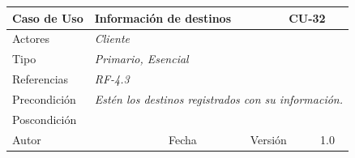 \begin{table}[H]
    \begin{tabular}{|llllllll|}
    \hline
    \multicolumn{1}{|l|}{Caso de Uso}                     & \multicolumn{5}{l|}{Información de destinos}                                                                                                                                                & \multicolumn{2}{l|}{\cellcolor[HTML]{E6E6E6}CU-32}                                      \\ \hline
    \multicolumn{1}{|l|}{Actores}                         & \multicolumn{7}{l|}{{\color[HTML]{808080} \textit{Cliente}}}                                                                                                                                                                                                                          \\ \hline
    \multicolumn{1}{|l|}{Tipo}                            & \multicolumn{7}{l|}{{\color[HTML]{808080} \textit{Primario, Esencial}}}                                                                                                                                                                                                               \\ \hline
    \multicolumn{1}{|l|}{Referencias}                     & \multicolumn{2}{l|}{{\color[HTML]{808080} \textit{RF-4.3}}}                                        & \multicolumn{5}{l|}{}                                                                                                                                                            \\ \hline
    \multicolumn{1}{|l|}{Precondición}                    & \multicolumn{7}{l|}{{\color[HTML]{808080} \textit{Estén los destinos registrados con su información.}}}                                                                                                                                                                               \\ \hline
    \multicolumn{1}{|l|}{Poscondición}                    & \multicolumn{7}{l|}{}                                                                                                                                                                                                                                                                 \\ \hline
    \multicolumn{1}{|l|}{Autor}                           & \multicolumn{1}{l|}{}                                     & \multicolumn{2}{l|}{Fecha}                                     & \multicolumn{1}{l|}{}                   & \multicolumn{2}{l|}{Versión}                                     & 1.0                                         \\ \hline

\end{tabular}
\end{table}
